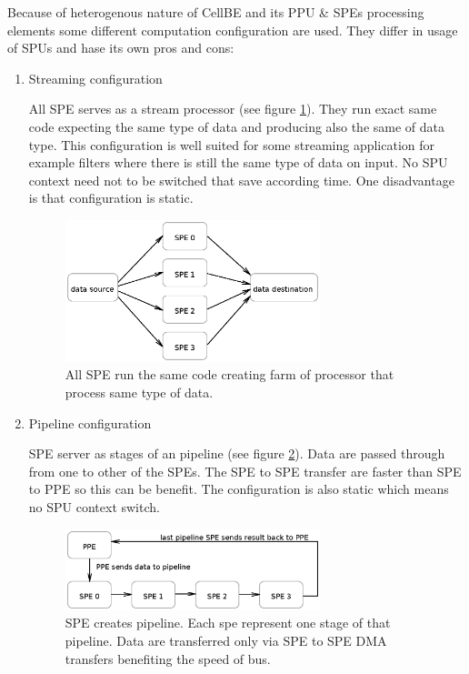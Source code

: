 \par
Because of heterogenous nature of CellBE and its PPU \& SPEs processing elements some different computation configuration are used.
 They differ in usage of SPUs and hase its own pros and cons:
\begin{enumerate}
\item Streaming configuration
\par
All SPE serves as a stream processor (see figure \ref{fg:streamingModel}).
They run exact same code expecting the same type of data and producing also the same of data type.
This configuration is well suited for some streaming application for example filters where there is still the same type of data on input.
No SPU context need not to be switched that save according time.
One disadvantage is that configuration is static.

\begin{figure}
    \centering
    \includegraphics[width=0.7\textwidth]{data/streamingModel}
    \caption[Streaming SPE configuration]{All SPE run the same code creating farm of processor that process same type of data.}
    \label{fg:streamingModel}
\end{figure}

\item Pipeline configuration
\par
SPE server as stages of an pipeline (see figure \ref{fg:pipelineModel}).
Data are passed through from one to other of the SPEs.
The SPE to SPE transfer are faster than SPE to PPE so this can be benefit.
The configuration is also static which means no SPU context switch.

\begin{figure}
    \centering
    \includegraphics[width=0.7\textwidth]{data/pipelineModel}
    \caption[Pipeline SPE configuration]{SPE creates pipeline. Each spe represent one stage of that pipeline. Data are transferred only via SPE to SPE DMA transfers benefiting the speed of bus.}
    \label{fg:pipelineModel}
\end{figure}


\end{enumerate}
